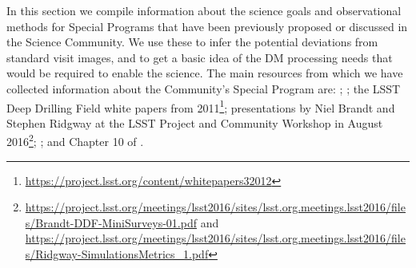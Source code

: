 \documentclass[DM,lsstdoc,toc]{lsstdoc}
\begin{document}
In this section we compile information about the science goals and observational methods for Special Programs that have been previously proposed or discussed in the Science Community. We use these to infer the potential deviations from standard visit images, and to get a basic idea of the DM processing needs that would be required to enable the science. The main resources from which we have collected information about the Community's Special Program are: \citep{2008arXiv0805.2366I}; \citep{LPM-17}; the LSST Deep Drilling Field white papers from 2011\footnote{\url{https://project.lsst.org/content/whitepapers32012}}; presentations by Niel Brandt and Stephen Ridgway at the LSST Project and Community Workshop in August 2016\footnote{\url{https://project.lsst.org/meetings/lsst2016/sites/lsst.org.meetings.lsst2016/files/Brandt-DDF-MiniSurveys-01.pdf} and \url{https://project.lsst.org/meetings/lsst2016/sites/lsst.org.meetings.lsst2016/files/Ridgway-SimulationsMetrics_1.pdf}}; \citep{2013arXiv1304.3455G}; and Chapter 10 of \citep{2017arXiv170804058L}.

\end{document}
